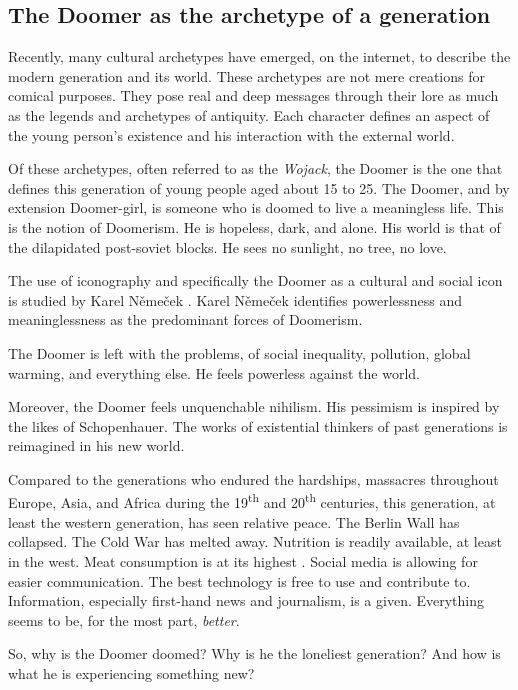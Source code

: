 \documentclass[../report.tex]{subfiles}
\begin{document}
\subsection{The Doomer as the archetype of a generation}

Recently, many cultural archetypes have emerged, on the internet, to describe the modern generation and its world. 
These archetypes are not mere creations for comical purposes. They pose real and deep messages through their lore as much as the legends and archetypes of antiquity.
Each character defines an aspect of the young person's existence and his interaction with the external world. 

Of these archetypes, often referred to as the \textit{Wojack}, the Doomer is the one that defines this generation of young people aged about 15 to 25.
The Doomer, and by extension Doomer-girl, is someone who is doomed to live a meaningless life. This is the notion of Doomerism.
He is hopeless, dark, and alone. His world is that of the dilapidated post-soviet blocks. He sees no sunlight, no tree, no love. 

The use of iconography and specifically the Doomer as a cultural and social icon is studied by Karel Němeček \cite{memes_reservoir}. Karel Němeček identifies powerlessness and meaninglessness as the predominant forces of Doomerism. 

The Doomer is left with the problems, of social inequality, pollution, global warming, and everything else. He feels powerless against the world.

Moreover, the Doomer feels unquenchable nihilism. His pessimism is inspired by the likes of Schopenhauer. The works of existential thinkers of past generations is reimagined in his new world. 

Compared to the generations who endured the hardships, massacres throughout Europe, Asia, and Africa during the 19\textsuperscript{th} and 20\textsuperscript{th} centuries, 
this generation, at least the western generation, has seen relative peace. 
The Berlin Wall has collapsed.
The Cold War has melted away.
Nutrition is readily available, at least in the west. 
Meat consumption is at its highest \cite{meat_cons} \cite{meat_cons_canada} \cite{meat_cons_2022}.
Social media is allowing for easier communication.
The best technology is free to use and contribute to.
Information, especially first-hand news and journalism, is a given.
Everything seems to be, for the most part, \textit{better}.

So, why is the Doomer doomed? Why is he the loneliest generation? And how is what he is experiencing something new?
\end{document}
